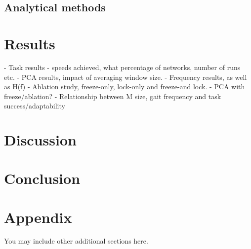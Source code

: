 \documentclass{article} %
\begin{document}
\subsection{Analytical methods}


\section{Results}

- Task results - speeds achieved, what percentage of networks, number of runs etc. 
- PCA results, impact of averaging window size.
- Frequency results, as well as H(f)
- Ablation study, freeze-only, lock-only and freeze-and lock. 
- PCA with freeze/ablation? 
- Relationship between M size, gait frequency and task success/adaptability

\section{Discussion}


\section{Conclusion}





\appendix
\section{Appendix}
You may include other additional sections here.
\end{document}
